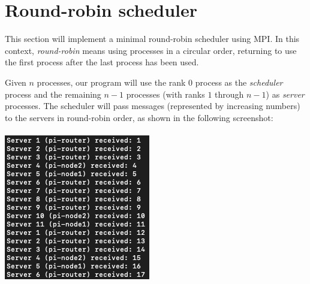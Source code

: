 \documentclass{article}
\begin{document}
\section{Round-robin scheduler}
This section will implement a minimal round-robin scheduler using MPI. In this context, \emph{round-robin} means using processes in a circular order, returning to use the first process after the last process has been used.

Given $n$ processes, our program will use the rank $0$ process as the \emph{scheduler} process and the remaining $n-1$ processes (with ranks $1$ through $n - 1$) as \emph{server} processes. The scheduler will pass messages (represented by increasing numbers) to the servers in round-robin order, as shown in the following screenshot:
\\~\\
\includegraphics[scale=0.5]{images/roundrobin-output.png}
\end{document}
